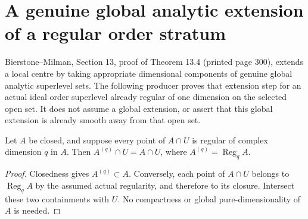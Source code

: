 \section{A genuine global analytic extension of a regular order stratum}

Bierstone--Milman\cite{bierstone-milman97-invent-math}, Section 13,
proof of Theorem 13.4 (printed page 300), extends a local centre by taking
appropriate dimensional components of genuine global analytic superlevel
sets. The following producer proves that extension step for an actual ideal
order superlevel already regular of one dimension on the selected open set.
It does not assume a global extension, or assert that this global extension
is already smooth away from that open set.

\begin{lemma}
\label{hir:dimension-part-regular-trace}
\leanok
Let $A$ be closed, and suppose every point of $A\cap U$ is regular of
complex dimension $q$ in $A$. Then $A^{(q)}\cap U=A\cap U$, where
$A^{(q)}=\overline{\operatorname{Reg}_q A}$.
\end{lemma}
\begin{proof}
Closedness gives $A^{(q)}\subset A$. Conversely, each point of $A\cap U$
belongs to $\operatorname{Reg}_q A$ by the assumed actual regularity,
and therefore to its closure. Intersect these two containments with $U$.
No compactness or global pure-dimensionality of $A$ is needed.
\end{proof}

